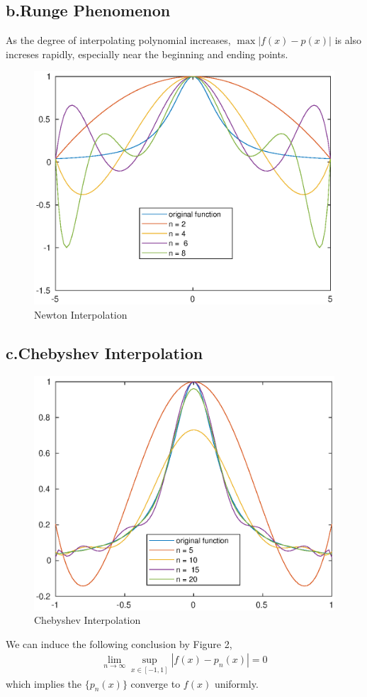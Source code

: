 \documentclass[twoside,a4paper,12pt]{article}
\begin{document}
\subsection*{b.Runge Phenomenon}
As the degree of interpolating polynomial increases, $\max{|f(x)-p(x)|}$ is also increses rapidly, especially near the beginning and ending points.
\begin{figure}[htbp]
 \centering
 \includegraphics{NewtonPlot.eps}
 \caption{Newton Interpolation}
\end{figure}
\subsection*{c.Chebyshev Interpolation}

\begin{figure}
 \centering
\includegraphics{ChebyshevPlot.eps}
 \caption{Chebyshev Interpolation}
\end{figure}
We can induce the following conclusion by Figure 2, 
\begin{gather}
\lim_{n\to \infty}\sup_{x\in[-1,1]}|f(x)-p_n(x)| = 0
\end{gather}
which implies the $\{p_n(x)\}$ converge to $f(x)$ uniformly.
\end{document}
